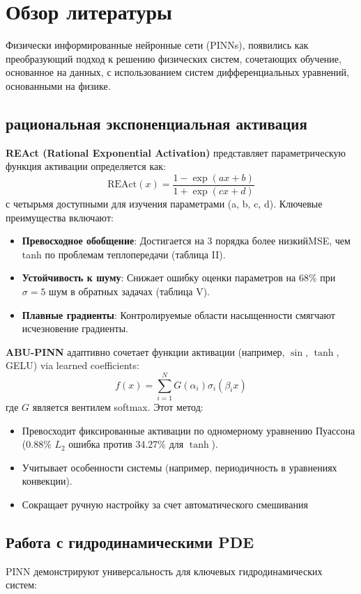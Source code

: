 \section*{Обзор литературы}
Физически информированные нейронные сети (PINNs), появились как преобразующий
подход к решению физических систем, сочетающих обучение, основанное
на данных, с использованием систем дифференциальных уравнений, основанными на физике.



\subsection{рациональная экспоненциальная активация}
\textbf{REAct (Rational Exponential Activation)} \cite{react} 
представляет параметрическую функция активации определяется как:
\[
\text{REAct}(x) = \frac{1 - \exp(ax + b)}{1 + \exp(cx + d)}
\]
с четырьмя доступными для изучения параметрами (a, b, c, d). Ключевые преимущества включают:
\begin{itemize}
    \item \textbf{Превосходное обобщение}: Достигается на 3 порядка более низкийMSE, чем
    tanh по проблемам теплопередачи (таблица II).
    \item \textbf{Устойчивость к шуму}: Снижает ошибку оценки параметров на 68\% при $\sigma=5$ шум в обратных задачах (таблица V).
    \item \textbf{Плавные градиенты}: Контролируемые области насыщенности смягчают исчезновение градиенты.
\end{itemize}

\textbf{ABU-PINN} \cite{abu_pinn} адаптивно сочетает функции активации (например, $\sin$, $\tanh$, GELU) via learned coefficients:
\[
f(x) = \sum_{i=1}^N G(\alpha_i) \sigma_i(\beta_i x)
\]
где $G$ является вентилем softmax. Этот метод:
\begin{itemize}
    \item Превосходит фиксированные активации по одномерному уравнению Пуассона (0.88\% $L_2$ ошибка против 34.27\% для $\tanh$).
    \item Учитывает особенности системы (например, периодичность в уравнениях конвекции).
    \item Сокращает ручную настройку за счет автоматического смешивания
\end{itemize}

\subsection{Работа с гидродинамическими PDE}
PINN демонстрируют универсальность для ключевых гидродинамических систем:

